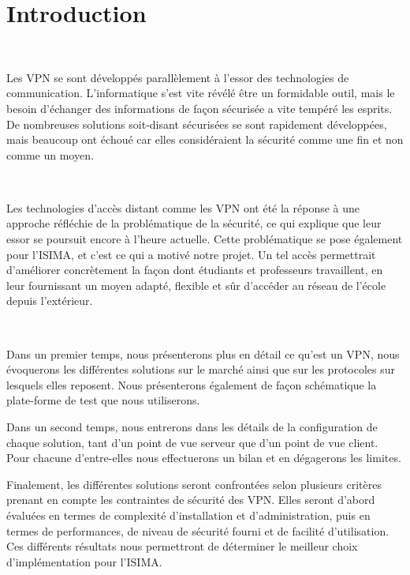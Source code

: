 \section*{Introduction}

~

Les VPN se sont développés parallèlement à l'essor des technologies de communication. L'informatique s'est vite révélé être un formidable outil, mais le besoin d'échanger des informations de façon sécurisée a vite tempéré les esprits. De nombreuses solutions soit-disant sécurisées se sont rapidement développées, mais beaucoup ont échoué car elles considéraient la sécurité comme une fin et non comme un moyen.

~

Les technologies d'accès distant comme les VPN ont été la réponse à une approche réfléchie de la problématique de la sécurité, ce qui explique que leur essor se poursuit encore à l'heure actuelle. Cette problématique se pose également pour l'ISIMA, et c'est ce qui a motivé notre projet. Un tel accès permettrait d'améliorer concrètement la façon dont étudiants et professeurs travaillent, en leur fournissant un moyen adapté, flexible et sûr d'accéder au réseau de l'école depuis l'extérieur.

~

Dans un premier temps, nous présenterons plus en détail ce qu'est un VPN, nous évoquerons les différentes solutions sur le marché ainsi que sur les protocoles sur lesquels elles reposent. Nous présenterons également de façon schématique la plate-forme de test que nous utiliserons.

Dans un second temps, nous entrerons dans les détails de la configuration de chaque solution, tant d'un point de vue serveur que d'un point de vue client. Pour chacune d'entre-elles nous effectuerons un bilan et en dégagerons les limites.

Finalement, les différentes solutions seront confrontées selon plusieurs critères prenant en compte les contraintes de sécurité des VPN. Elles seront d'abord évaluées en termes de complexité d'installation et d'administration, puis en termes de performances, de niveau de sécurité fourni et de facilité d'utilisation. Ces différents résultats nous permettront de déterminer le meilleur choix d'implémentation pour l'ISIMA.

\pagebreak
